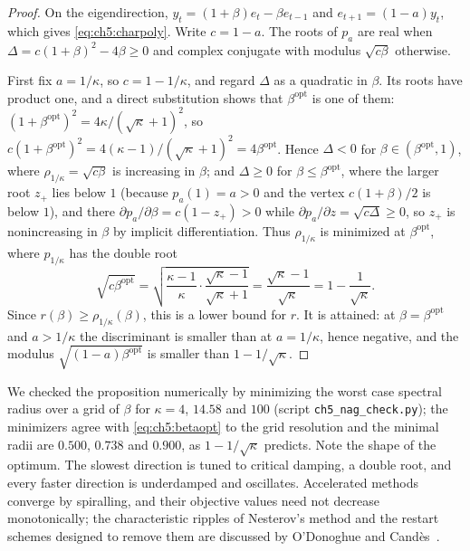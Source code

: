 \begin{proof}
On the eigendirection, $y_t=(1+\beta)e_t-\beta e_{t-1}$ and
$e_{t+1}=(1-a)y_t$, which gives \eqref{eq:ch5:charpoly}.  Write $c=1-a$.  The
roots of $p_a$ are real when $\Delta=c(1+\beta)^2-4\beta\ge0$ and complex
conjugate with modulus $\sqrt{c\beta}$ otherwise.

First fix $a=1/\kappa$, so $c=1-1/\kappa$, and regard $\Delta$ as a quadratic in
$\beta$.  Its roots have product one, and a direct substitution shows that
$\beta^{\mathrm{opt}}$ is one of them: $(1+\beta^{\mathrm{opt}})^2=
4\kappa/(\sqrt\kappa+1)^2$, so $c(1+\beta^{\mathrm{opt}})^2=
4(\kappa-1)/(\sqrt\kappa+1)^2=4\beta^{\mathrm{opt}}$.  Hence $\Delta<0$ for
$\beta\in(\beta^{\mathrm{opt}},1)$, where $\rho_{1/\kappa}=\sqrt{c\beta}$ is
increasing in $\beta$; and $\Delta\ge0$ for $\beta\le\beta^{\mathrm{opt}}$, where the
larger root $z_+$ lies below $1$ (because $p_a(1)=a>0$ and the vertex
$c(1+\beta)/2$ is below $1$), and there $\partial p_a/\partial\beta=c(1-z_+)>0$
while $\partial p_a/\partial z=\sqrt{c\Delta}\ge0$, so $z_+$ is nonincreasing in
$\beta$ by implicit differentiation.
Thus $\rho_{1/\kappa}$ is minimized at $\beta^{\mathrm{opt}}$, where $p_{1/\kappa}$ has
the double root
\[
  \sqrt{c\beta^{\mathrm{opt}}}
  =\sqrt{\frac{\kappa-1}{\kappa}\cdot\frac{\sqrt\kappa-1}{\sqrt\kappa+1}}
  =\frac{\sqrt\kappa-1}{\sqrt\kappa}=1-\frac1{\sqrt\kappa}.
\]
Since $r(\beta)\ge\rho_{1/\kappa}(\beta)$, this is a lower bound for $r$.  It is
attained: at $\beta=\beta^{\mathrm{opt}}$ and $a>1/\kappa$ the discriminant is
smaller than at $a=1/\kappa$, hence negative, and the modulus
$\sqrt{(1-a)\beta^{\mathrm{opt}}}$ is smaller than $1-1/\sqrt\kappa$.
\end{proof}

We checked the proposition numerically by minimizing the worst case spectral
radius over a grid of $\beta$ for $\kappa=4$, $14.58$ and $100$ (script
\texttt{ch5\_nag\_check.py}); the minimizers agree with \eqref{eq:ch5:betaopt}
to the grid resolution and the minimal radii are $0.500$, $0.738$ and $0.900$,
as $1-1/\sqrt\kappa$ predicts.  Note the shape of the optimum.  The slowest
direction is tuned to critical damping, a double root, and every faster
direction is underdamped and oscillates.  Accelerated methods converge by
spiralling, and their objective values need not decrease monotonically; the
characteristic ripples of Nesterov's method and the restart schemes designed
to remove them are discussed by O'Donoghue and Cand\`es~\cite{odonoghue2015}.

